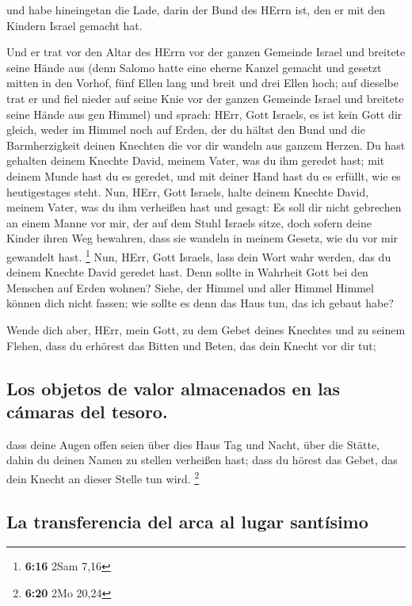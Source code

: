  und habe hineingetan die Lade, darin der Bund des HErrn
ist, den er mit den Kindern Israel gemacht hat.

 Und er trat vor den Altar des HErrn vor der ganzen
Gemeinde Israel und breitete seine Hände aus  (denn
Salomo hatte eine eherne Kanzel gemacht und gesetzt mitten in den
Vorhof, fünf Ellen lang und breit und drei Ellen hoch; auf dieselbe trat
er und fiel nieder auf seine Knie vor der ganzen Gemeinde Israel und
breitete seine Hände aus gen Himmel)  und sprach: HErr,
Gott Israels, es ist kein Gott dir gleich, weder im Himmel noch auf
Erden, der du hältst den Bund und die Barmherzigkeit deinen Knechten die
vor dir wandeln aus ganzem Herzen.  Du hast gehalten
deinem Knechte David, meinem Vater, was du ihm geredet hast; mit deinem
Munde hast du es geredet, und mit deiner Hand hast du es erfüllt, wie es
heutigestages steht.  Nun, HErr, Gott Israels, halte
deinem Knechte David, meinem Vater, was du ihm verheißen hast und
gesagt: Es soll dir nicht gebrechen an einem Manne vor mir, der auf dem
Stuhl Israels sitze, doch sofern deine Kinder ihren Weg bewahren, dass
sie wandeln in meinem Gesetz, wie du vor mir gewandelt hast. \footnote{\textbf{6:16}
  2Sam 7,16}  Nun, HErr, Gott Israels, lass dein Wort
wahr werden, das du deinem Knechte David geredet hast. 
Denn sollte in Wahrheit Gott bei den Menschen auf Erden wohnen? Siehe,
der Himmel und aller Himmel Himmel können dich nicht fassen; wie sollte
es denn das Haus tun, das ich gebaut habe?

 Wende dich aber, HErr, mein Gott, zu dem Gebet deines
Knechtes und zu seinem Flehen, dass du erhörest das Bitten und Beten,
das dein Knecht vor dir tut;

\hypertarget{los-objetos-de-valor-almacenados-en-las-cuxe1maras-del-tesoro.}{%
\subsection{Los objetos de valor almacenados en las cámaras del
tesoro.}\label{los-objetos-de-valor-almacenados-en-las-cuxe1maras-del-tesoro.}}

 dass deine Augen offen seien über dies Haus Tag und
Nacht, über die Stätte, dahin du deinen Namen zu stellen verheißen hast;
dass du hörest das Gebet, das dein Knecht an dieser Stelle tun wird.
\footnote{\textbf{6:20} 2Mo 20,24}

\hypertarget{la-transferencia-del-arca-al-lugar-santuxedsimo}{%
\subsection{La transferencia del arca al lugar
santísimo}\label{la-transferencia-del-arca-al-lugar-santuxedsimo}}


